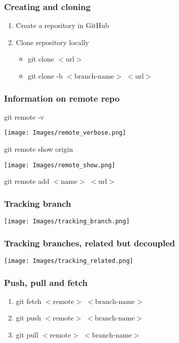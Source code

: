 \documentclass{beamer}
\begin{document}
	\begin{frame}[plain]
		\frametitle{Creating and cloning}
		
		\begin{enumerate}
			\item Create a repository in GitHub 
			\item Clone repository locally 
				\begin{itemize}
					\item git clone $<$url$>$
					\item git clone -b $<\text{branch-name}>$ $<$url$>$
				\end{itemize}
		\end{enumerate}
	\end{frame}

	\begin{frame}[plain]
		\frametitle{Information on remote repo}
		git remote -v 
		\begin{center}
			\texttt{[image: Images/remote\_verbose.png]}
		\end{center}

		git remote show origin
		\begin{center}
			\texttt{[image: Images/remote\_show.png]}
		\end{center}

		git remote add $<\text{name}>$ $<\text{url}>$
	\end{frame}

	\begin{frame}[plain]
		\frametitle{Tracking branch}
	
		\begin{center}
			\texttt{[image: Images/tracking\_branch.png]}
		\end{center}
	\end{frame}

	\begin{frame}[plain]
		\frametitle{Tracking branches, related but decoupled}
		
		\begin{center}
			\texttt{[image: Images/tracking\_related.png]}
		\end{center}
		
	\end{frame}

	\begin{frame}[plain]
		\frametitle{Push, pull and fetch}
	
		\begin{enumerate}
			\item git fetch $<\text{remote}>$ $<\text{branch-name}>$
			\item git push $<\text{remote}>$ $<\text{branch-name}>$
			\item git pull $<\text{remote}>$ $<\text{branch-name}>$ 
		\end{enumerate}
	
	\end{frame}
\end{document}
